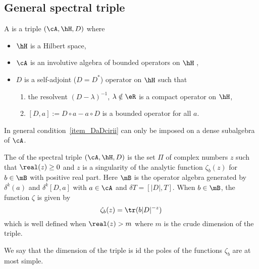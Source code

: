 \subsection{General spectral triple}
A  is a triple $(\cA,\hH,D)$ where
\begin{itemize}
\item $\hH$ is a Hilbert space,
\item $\cA$ is an involutive algebra of bounded operators on $\hH$ ,
\item $D$ is a self-adjoint ($D=D^*$) operator on $\hH$ such that
\begin{enumerate}
\item the resolvent $(D-\lambda)^{-1}$, $\lambda\notin\eR$ is a compact operator on $\hH$,
\item\label{item_DaDcirii} $[D,a]:=D\circ a-a\circ D$ is a bounded operator for all $a$.
\end{enumerate}
\end{itemize}
In general condition~\ref{item_DaDcirii} can only be imposed on a dense subalgebra of $\cA$.

\begin{definition}	\label{DefDimSpec}
The  of the spectral triple $(\cA,\hH,D)$ is the set $\Pi$ of complex numbers $z$ such that $\real(z)\geq 0$ and $z$ is a singularity of the analytic function $\zeta_b(z)$ for $b\in\mB$ with positive real part. Here $\mB$ is the operator algebra generated by $\delta^k(a)$ and $\delta^k[D,a]$ with $a\in \cA$ and $\delta T=[| D |,T]$. When $b\in\mB$, the function $\zeta$ is given by
\[
  \zeta_b(z)=\tr(b| D |^{-z})
\]
which is well defined when $\real(z)>m$ where $m$ is the crude dimension of the triple.
\end{definition}

We say that the dimension of the triple is  id the poles of the functions $\zeta_b$ are at most simple.

